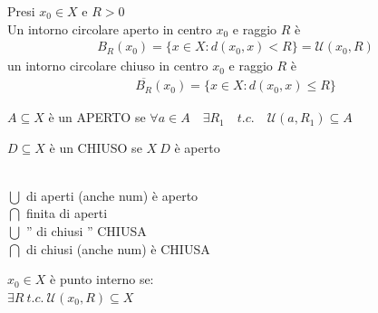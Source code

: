 \documentclass[a4paper, oneside]{article}
\begin{document}
    \begin{definition}
        Presi $x_0 \in X$ e $R>0$\\
        Un intorno circolare aperto in centro $x_0$ e raggio $R$ è\\
        \begin{gather*}
            B_R (x_0) = \{ x \in X: d(x_0, x) < R\} = \mathcal{U} (x_0,R)
        \end{gather*}
        un intorno circolare chiuso in centro $x_0$ e raggio $R$ è\\
        \begin{gather*}
            \overline{B_R} (x_0) = \{ x \in X:d(x_0, x) \leq R\}
        \end{gather*}
    \end{definition}
    \begin{definition}
        $A \subseteq X$ è un APERTO se $\forall a \in A \quad \exists R_1 \quad t.c. \quad \mathcal{U}(a, R_1) \subseteq A$
    \end{definition}
    \begin{definition}
        $D \subseteq X$ è un CHIUSO se $X\ D$ è aperto
    \end{definition}

    \\
    $\bigcup$ di aperti (anche num) è aperto\\
    $\bigcap$ finita di aperti \\
    $\bigcup$  '' di chiusi '' CHIUSA\\
    $\bigcap$ di chiusi (anche num) è CHIUSA\\
    \begin{definition}
        $x_0 \in X $ è punto interno se:\\
        $\exists R \ t.c. \ \mathcal{U}(x_0, R) \subseteq X$
    \end{definition}
\end{document}
